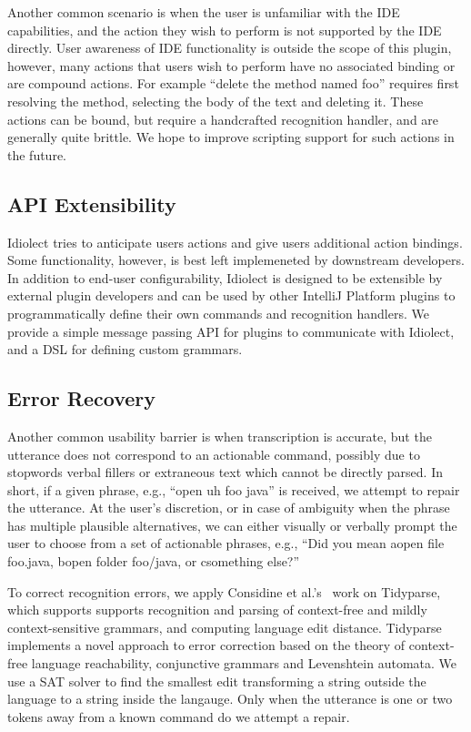 \documentclass[conference]{IEEEtran}
\begin{document}
Another common scenario is when the user is unfamiliar with the IDE capabilities, and the action they wish to perform is not supported by the IDE directly. User awareness of IDE functionality is outside the scope of this plugin, however, many actions that users wish to perform have no associated binding or are compound actions. For example ``delete the method named \textlangle foo\textrangle'' requires first resolving the method, selecting the body of the text and deleting it. These actions can be bound, but require a handcrafted recognition handler, and are generally quite brittle. We hope to improve scripting support for such actions in the future.

\subsection{API Extensibility}

Idiolect tries to anticipate users actions and give users additional action bindings. Some functionality, however, is best left implemeneted by downstream developers. In addition to end-user configurability, Idiolect is designed to be extensible by external plugin developers and can be used by other IntelliJ Platform plugins to programmatically define their own commands and recognition handlers. We provide a simple message passing API for plugins to communicate with Idiolect, and a DSL for defining custom grammars.

\subsection{Error Recovery}\label{sec:error}

Another common usability barrier is when transcription is accurate, but the utterance does not correspond to an actionable command, possibly due to stopwords verbal fillers or extraneous text which cannot be directly parsed. In short, if a given phrase, e.g., ``open uh foo java'' is received, we attempt to repair the utterance. At the user's discretion, or in case of ambiguity when the phrase has multiple plausible alternatives, we can either visually or verbally prompt the user to choose from a set of actionable phrases, e.g., ``Did you mean \textlangle a\textrangle open file foo.java, \textlangle b\textrangle open folder foo/java, or \textlangle c\textrangle something else?''

To correct recognition errors, we apply Considine et al.'s~\cite{considine2022tidyparse} work on Tidyparse, which supports supports recognition and parsing of context-free and mildly context-sensitive grammars, and computing language edit distance. Tidyparse implements a novel approach to error correction based on the theory of context-free language reachability, conjunctive grammars and Levenshtein automata. We use a SAT solver to find the smallest edit transforming a string outside the language to a string inside the langauge. Only when the utterance is one or two tokens away from a known command do we attempt a repair.
\end{document}
